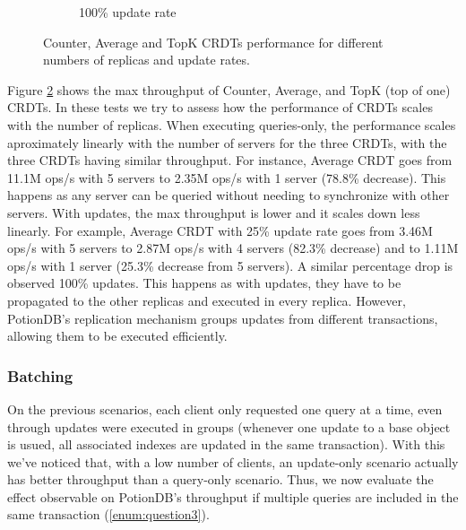 \documentclass{vldb}
\newcommand{\grumbler}[2]{{\color{red}{\bf #1:} #2}}
\renewcommand{\grumbler}[2]{}
\newcommand{\andre}[1]{\grumbler{andre}{#1}}
\begin{document}
\begin{figure}
\begin{subfigure}{.33\linewidth}
	\caption{100\% update rate}
	\label{fig:CounterAvgTopK100upd}
	\end{subfigure}
	\caption{Counter, Average and TopK CRDTs performance for different numbers of replicas and update rates.}
	\label{fig:CounterAvgTopK}
\end{figure}

Figure \ref{fig:CounterAvgTopK} shows the max throughput of Counter, Average, and TopK (top of one) CRDTs.
In these tests we try to assess how the performance of CRDTs scales with the number of replicas.
When executing queries-only, the performance scales aproximately linearly with the number of servers for the three CRDTs, with the three CRDTs having similar throughput.
For instance, Average CRDT goes from 11.1M ops/s with 5 servers to 2.35M ops/s with 1 server (78.8\% decrease).
This happens as any server can be queried without needing to synchronize with other servers.
With updates, the max throughput is lower and it scales down less linearly.
For example, Average CRDT with 25\% update rate goes from 3.46M ops/s with 5 servers to 2.87M ops/s with 4 servers (82.3\% decrease) and to 1.11M ops/s with 1 server (25.3\% decrease from 5 servers).
A similar percentage drop is observed 100\% updates.
This happens as with updates, they have to be propagated to the other replicas and executed in every replica.
However, PotionDB's replication mechanism groups updates from different transactions, allowing them to be executed efficiently.
\andre{No idea why topK has a bit more performance with 25\% updates. I'm not sure why update-only has better throughput than query+update, but I can think of two possible reasons: a) updates make queries wait; b) updates reply quicker as a reply is sent as soon as the partitions confirm they will commit (and not after the commit is executed), unlike queries which must wait for the result to be ready.}

\subsubsection{Batching}

\andre{Old text - batching does not really have any noticeable improvement when testing on Grid in normal settings. It would surely help with tests that have latency added though.}

On the previous scenarios, each client only requested one query at a time, even through updates were executed in groups (whenever one update to a base object is usued, all associated indexes are updated in the same transaction).
With this we've noticed that, with a low number of clients, an update-only scenario actually has better throughput than a query-only scenario.
Thus, we now evaluate the effect observable on PotionDB's throughput if multiple queries are included in the same transaction (\ref{enum:question3}).
\end{document}
